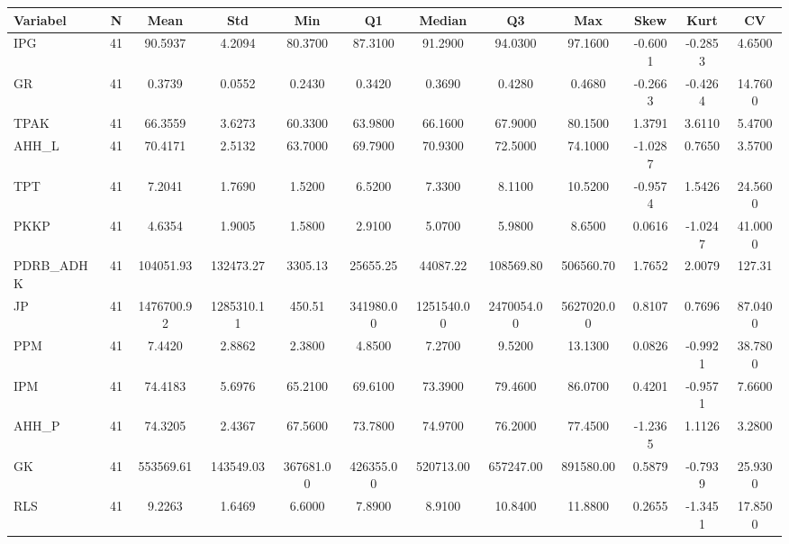 \begin{adjustbox}{max width=\textwidth}
\small
\begin{tabular}{|p{2.5cm}|c|c|c|c|c|c|c|c|c|c|c|}
\hline
\textbf{Variabel} & \textbf{N} & \textbf{Mean} & \textbf{Std} & \textbf{Min} & \textbf{Q1} & \textbf{Median} & \textbf{Q3} & \textbf{Max} & \textbf{Skew} & \textbf{Kurt} & \textbf{CV} \\
\hline
IPG & 41 & 90.5937 & 4.2094 & 80.3700 & 87.3100 & 91.2900 & 94.0300 & 97.1600 & -0.6001 & -0.2853 & 4.6500 \\
GR & 41 & 0.3739 & 0.0552 & 0.2430 & 0.3420 & 0.3690 & 0.4280 & 0.4680 & -0.2663 & -0.4264 & 14.7600 \\
TPAK & 41 & 66.3559 & 3.6273 & 60.3300 & 63.9800 & 66.1600 & 67.9000 & 80.1500 & 1.3791 & 3.6110 & 5.4700 \\
AHH\_L & 41 & 70.4171 & 2.5132 & 63.7000 & 69.7900 & 70.9300 & 72.5000 & 74.1000 & -1.0287 & 0.7650 & 3.5700 \\
TPT & 41 & 7.2041 & 1.7690 & 1.5200 & 6.5200 & 7.3300 & 8.1100 & 10.5200 & -0.9574 & 1.5426 & 24.5600 \\
PKKP & 41 & 4.6354 & 1.9005 & 1.5800 & 2.9100 & 5.0700 & 5.9800 & 8.6500 & 0.0616 & -1.0247 & 41.0000 \\
PDRB\_ADHK & 41 & 104051.93 & 132473.27 & 3305.13 & 25655.25 & 44087.22 & 108569.80 & 506560.70 & 1.7652 & 2.0079 & 127.31 \\
JP & 41 & 1476700.92 & 1285310.11 & 450.51 & 341980.00 & 1251540.00 & 2470054.00 & 5627020.00 & 0.8107 & 0.7696 & 87.0400 \\
PPM & 41 & 7.4420 & 2.8862 & 2.3800 & 4.8500 & 7.2700 & 9.5200 & 13.1300 & 0.0826 & -0.9921 & 38.7800 \\
IPM & 41 & 74.4183 & 5.6976 & 65.2100 & 69.6100 & 73.3900 & 79.4600 & 86.0700 & 0.4201 & -0.9571 & 7.6600 \\
AHH\_P & 41 & 74.3205 & 2.4367 & 67.5600 & 73.7800 & 74.9700 & 76.2000 & 77.4500 & -1.2365 & 1.1126 & 3.2800 \\
GK & 41 & 553569.61 & 143549.03 & 367681.00 & 426355.00 & 520713.00 & 657247.00 & 891580.00 & 0.5879 & -0.7939 & 25.9300 \\
RLS & 41 & 9.2263 & 1.6469 & 6.6000 & 7.8900 & 8.9100 & 10.8400 & 11.8800 & 0.2655 & -1.3451 & 17.8500 \\
\hline
\end{tabular}
\end{adjustbox}
